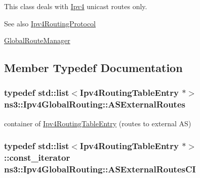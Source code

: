 This class deals with \hyperlink{classns3_1_1Ipv4}{Ipv4} unicast routes only.

\begin{DoxySeeAlso}{See also}
\hyperlink{classns3_1_1Ipv4RoutingProtocol}{Ipv4\+Routing\+Protocol} 

\hyperlink{classns3_1_1GlobalRouteManager}{Global\+Route\+Manager} 
\end{DoxySeeAlso}


\subsection{Member Typedef Documentation}
\subsubsection[{\texorpdfstring{A\+S\+External\+Routes}{ASExternalRoutes}}]{\setlength{\rightskip}{0pt plus 5cm}typedef {\bf std\+::list}$<${\bf Ipv4\+Routing\+Table\+Entry} $\ast$$>$ {\bf ns3\+::\+Ipv4\+Global\+Routing\+::\+A\+S\+External\+Routes}\hspace{0.3cm}{\ttfamily [private]}}\hypertarget{classns3_1_1Ipv4GlobalRouting_a1227a5732cb954fe1a2255b7799ba296}{}\label{classns3_1_1Ipv4GlobalRouting_a1227a5732cb954fe1a2255b7799ba296}


container of \hyperlink{classns3_1_1Ipv4RoutingTableEntry}{Ipv4\+Routing\+Table\+Entry} (routes to external AS) 

\subsubsection[{\texorpdfstring{A\+S\+External\+Routes\+CI}{ASExternalRoutesCI}}]{\setlength{\rightskip}{0pt plus 5cm}typedef {\bf std\+::list}$<${\bf Ipv4\+Routing\+Table\+Entry} $\ast$$>$\+::const\+\_\+iterator {\bf ns3\+::\+Ipv4\+Global\+Routing\+::\+A\+S\+External\+Routes\+CI}\hspace{0.3cm}{\ttfamily [private]}}\hypertarget{classns3_1_1Ipv4GlobalRouting_aabafd3cfb22a4cc8f84b166a97b88c57}{}\label{classns3_1_1Ipv4GlobalRouting_aabafd3cfb22a4cc8f84b166a97b88c57}


